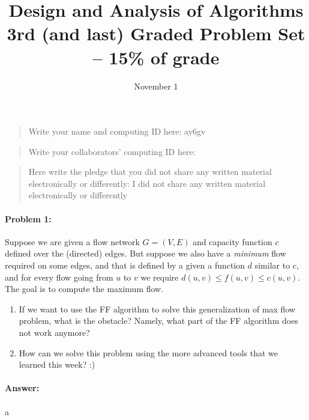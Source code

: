 \documentclass{article}
\title{Design and Analysis of Algorithms\\ {\bf 3rd (and last) Graded Problem Set -- 15\% of grade}}
\author{}
\date{November 1}
\begin{document}
\maketitle

\begin{quote}
    Write your name and computing ID here: ay6gv
\end{quote}

\vspace{20px}

\begin{quote}
    Write your collaborators' computing ID here:
\end{quote}

\vspace{20px}

\begin{quote}
    Here write the pledge that you did not share any written material electronically or differently: I did not share any written material electronically or differently
\end{quote}

\newpage
\paragraph{Problem 1:} Suppose we are given a flow network $G=(V,E)$ and capacity function $c$ defined over the (directed) edges. But suppose we also have a \emph{minimum} flow required on some edges, and that is defined by a given a function $d$ similar to $c$, and for every flow going from $u$ to $v$ we require $d(u,v) \leq f(u,v) \leq c(u,v)$. The goal is to compute the maximum flow.

\begin{enumerate}[label=\alph*]
\item If we want to use the FF algorithm to solve this generalization of max flow problem, what is the obstacle? Namely, what part of the FF algorithm does not work anymore?
\item How can we solve this problem using the more advanced tools that we learned this week? :)
\end{enumerate}
\paragraph{Answer:}
\paragraph{}
a
\end{document}
